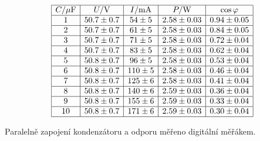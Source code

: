 \documentclass[a4paper,12pt]{article}
\begin{document}
\begin{table}
$$
\begin{array}{|c|c|c|c|c|}
\hline
C/\mu\mbox{F}&  U/\mbox{V}& I/\mbox{mA}&    P/\mbox{W}& \cos\varphi \\ \hline
1&  50.7\pm0.7& 54\pm5& 2.58\pm0.03&    0.94\pm0.05 \\ \hline
2&  50.7\pm0.7& 61\pm5& 2.58\pm0.03&    0.84\pm0.05 \\ \hline
3&  50.7\pm0.7& 71\pm5& 2.58\pm0.03&    0.72\pm0.04 \\ \hline
4&  50.7\pm0.7& 83\pm5& 2.58\pm0.03&    0.62\pm0.04 \\ \hline
5&  50.8\pm0.7& 96\pm5& 2.58\pm0.03&    0.53\pm0.04 \\ \hline
6&  50.8\pm0.7& 110\pm5& 2.58\pm0.03&    0.46\pm0.04 \\ \hline
7&  50.8\pm0.7& 125\pm6& 2.58\pm0.03&    0.41\pm0.04 \\ \hline
8&  50.8\pm0.7& 140\pm6& 2.59\pm 0.03&   0.36\pm0.04 \\ \hline
9&  50.8\pm0.7& 155\pm6&    2.59\pm 0.03&   0.33\pm0.04 \\ \hline
10& 50.8\pm0.7& 171\pm6&    2.59\pm 0.03&   0.30\pm0.04 \\ \hline
\end{array}
$$
\caption{Paralelně zapojení kondenzátoru a odporu měřeno digitální měřákem.}
\label{RCp2}
\end{table}
\end{document}
